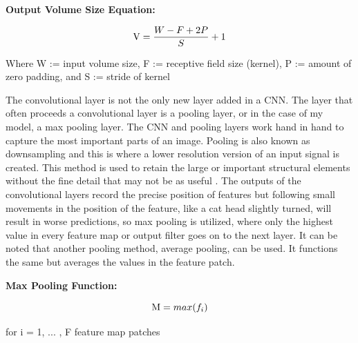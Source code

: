 \documentclass[12pt]{article}
\begin{document}
                \textbf{Output Volume Size Equation:}
                
                \begin{large}
                    
                    \[ \textnormal{V} = \frac{W - F + 2P}{S} + 1    \]

                \end{large}

                Where W := input volume size, F := receptive field size (kernel), P := amount of zero padding, and S := stride of kernel

                The convolutional layer is not the only new layer added in a CNN. 
                The layer that often proceeds a convolutional layer is a pooling layer, or in the case of my model, a max pooling layer.
                The CNN and pooling layers work hand in hand to capture the most important parts of an image. 
                Pooling is also known as downsampling and this is where a lower resolution version of an input signal is created. 
                This method is used to retain the large or important structural elements 
                without the fine detail that may not be as useful \cite{brownlee2020}. 
                The outputs of the convolutional layers record the precise position of features 
                but following small movements in the position of the feature, like a cat head slightly turned, 
                will result in worse predictions, so max pooling is utilized, 
                where only the highest value in every feature map or output filter goes on to the next layer. 
                It can be noted that another pooling method, average pooling, can be used. 
                It functions the same but averages the values in the feature patch.

                \textbf{Max Pooling Function:}
            
                \begin{large}
                    
                    \[ \textnormal{M} = max(f_i)  \]

                \end{large}

                for i = 1, ... , F feature map patches
\end{document}

